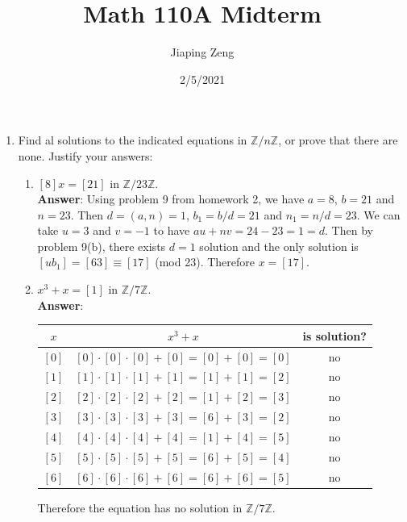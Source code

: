 \documentclass{article}
\title{Math 110A Midterm}
\date{2/5/2021}
\author{Jiaping Zeng}
\begin{document}

\begin{enumerate}
      \item Find al solutions to the indicated equations in $\mathbb{Z}/n\mathbb{Z}$, or prove that there are none. Justify your answers:
            \begin{enumerate}
                  \item $[8]x=[21]$ in $\mathbb{Z}/23\mathbb{Z}$.\\
                        \textbf{Answer}: Using problem 9 from homework 2, we have $a=8$, $b=21$ and $n=23$. Then $d=(a,n)=1$, $b_1=b/d=21$ and $n_1=n/d=23$. We can take $u=3$ and $v=-1$ to have $au+nv=24-23=1=d$. Then by problem 9(b), there exists $d=1$ solution and the only solution is $[ub_1]=[63]\equiv [17]$ (mod 23). Therefore $x=[17]$.
                  \item $x^3+x=[1]$ in $\mathbb{Z}/7\mathbb{Z}$.\\
                        \textbf{Answer}:
                        \begin{center}
                              \begin{tabular}{c|c|c}
                                    $x$   & $x^3+x$                                 & is solution? \\
                                    \hline
                                    $[0]$ & $[0]\cdot [0]\cdot [0]+[0]=[0]+[0]=[0]$ & no           \\
                                    $[1]$ & $[1]\cdot [1]\cdot [1]+[1]=[1]+[1]=[2]$ & no           \\
                                    $[2]$ & $[2]\cdot [2]\cdot [2]+[2]=[1]+[2]=[3]$ & no           \\
                                    $[3]$ & $[3]\cdot [3]\cdot [3]+[3]=[6]+[3]=[2]$ & no           \\
                                    $[4]$ & $[4]\cdot [4]\cdot [4]+[4]=[1]+[4]=[5]$ & no           \\
                                    $[5]$ & $[5]\cdot [5]\cdot [5]+[5]=[6]+[5]=[4]$ & no           \\
                                    $[6]$ & $[6]\cdot [6]\cdot [6]+[6]=[6]+[6]=[5]$ & no           \\
                              \end{tabular}
                        \end{center}
                        Therefore the equation has no solution in $\mathbb{Z}/7\mathbb{Z}$.

\end{enumerate}
\end{enumerate}
\end{document}
